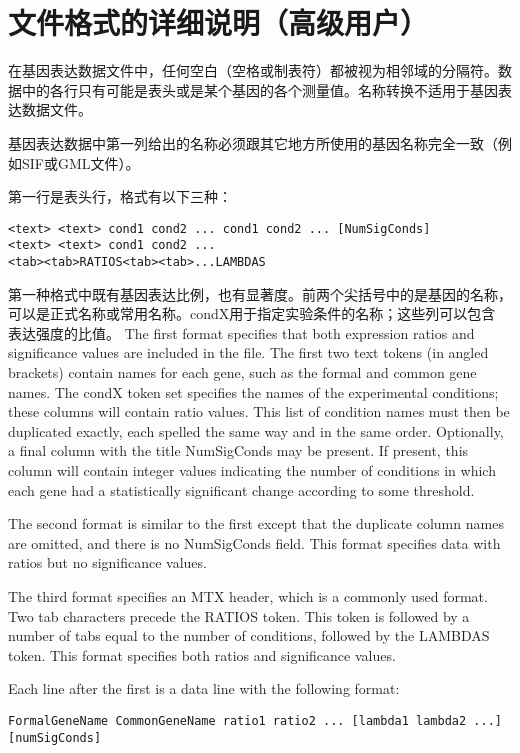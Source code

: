 \section{文件格式的详细说明（高级用户）}
在基因表达数据文件中，任何空白（空格或制表符）都被视为相邻域的分隔符。数据中的各行只有可能是表头或是某个基因的各个测量值。名称转换不适用于基因表达数据文件。

基因表达数据中第一列给出的名称必须跟其它地方所使用的基因名称完全一致（例如SIF或GML文件）。

第一行是表头行，格式有以下三种：
\begin{verbatim}
<text> <text> cond1 cond2 ... cond1 cond2 ... [NumSigConds]
<text> <text> cond1 cond2 ...
<tab><tab>RATIOS<tab><tab>...LAMBDAS
\end{verbatim}
第一种格式中既有基因表达比例，也有显著度。前两个尖括号中的是基因的名称，
可以是正式名称或常用名称。condX用于指定实验条件的名称；这些列可以包含
表达强度的比值。
The first format specifies that both expression ratios and significance values
are included in the file. The first two text tokens (in angled brackets)
contain names for each gene, such as the formal and common gene names. The
condX token set specifies the names of the experimental conditions; these
columns will contain ratio values. This list of condition names must then be
duplicated exactly, each spelled the same way and in the same order.
Optionally, a final column with the title NumSigConds may be present. If
present, this column will contain integer values indicating the number of
conditions in which each gene had a statistically significant change according
to some threshold. 

The second format is similar to the first except that the duplicate column
names are omitted, and there is no NumSigConds field. This format specifies
data with ratios but no significance values. 

The third format specifies an MTX header, which is a commonly used format. Two
tab characters precede the RATIOS token. This token is followed by a number of
tabs equal to the number of conditions, followed by the LAMBDAS token. This
format specifies both ratios and significance values. 

Each line after the first is a data line with the following format: 
\begin{verbatim}
FormalGeneName CommonGeneName ratio1 ratio2 ... [lambda1 lambda2 ...] [numSigConds]
\end{verbatim}

